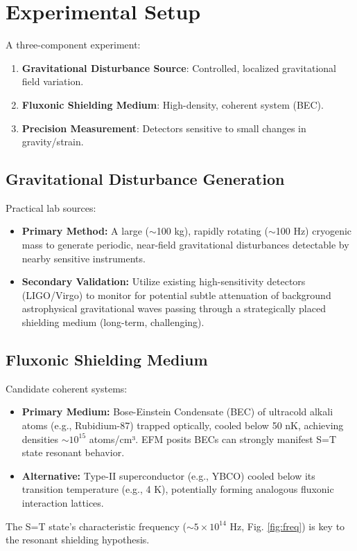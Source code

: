 \documentclass[11pt]{article}
\begin{document}
\section{Experimental Setup}
A three-component experiment:
\begin{enumerate}
    \item \textbf{Gravitational Disturbance Source}: Controlled, localized gravitational field variation.
    \item \textbf{Fluxonic Shielding Medium}: High-density, coherent system (BEC).
    \item \textbf{Precision Measurement}: Detectors sensitive to small changes in gravity/strain.
\end{enumerate}

\subsection{Gravitational Disturbance Generation}
Practical lab sources:
\begin{itemize}
    \item \textbf{Primary Method:} A large (\(\sim\)100 kg), rapidly rotating (\(\sim\)100 Hz) cryogenic mass to generate periodic, near-field gravitational disturbances detectable by nearby sensitive instruments.
    \item \textbf{Secondary Validation:} Utilize existing high-sensitivity detectors (LIGO/Virgo) to monitor for potential subtle attenuation of background astrophysical gravitational waves passing through a strategically placed shielding medium (long-term, challenging).
\end{itemize}

\subsection{Fluxonic Shielding Medium}
Candidate coherent systems:
\begin{itemize}
    \item \textbf{Primary Medium:} Bose-Einstein Condensate (BEC) of ultracold alkali atoms (e.g., Rubidium-87) trapped optically, cooled below 50 nK, achieving densities \(\sim 10^{15}\) atoms/cm³. EFM posits BECs can strongly manifest S=T state resonant behavior.
    \item \textbf{Alternative:} Type-II superconductor (e.g., YBCO) cooled below its transition temperature (e.g., 4 K), potentially forming analogous fluxonic interaction lattices.
\end{itemize}
The S=T state's characteristic frequency (\(\sim 5\times 10^{14}\) Hz, Fig. \ref{fig:freq}) is key to the resonant shielding hypothesis.
\end{document}
